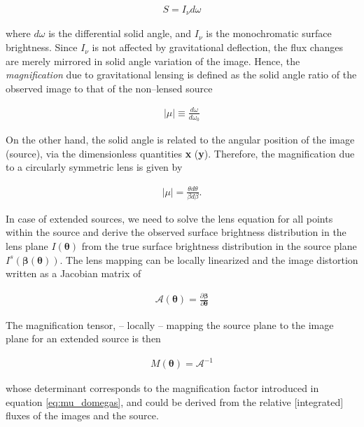 \documentclass[a4wide,12pt]{book}
\begin{document}
{\begin{eqnarray}
\label{eq:flux_to_SB}
S = I_{\nu} d\omega
\end{eqnarray}

where $d\omega$ is the differential solid angle, and $I_{\nu}$ is the monochromatic surface brightness. Since $I_{\nu}$ is not affected by gravitational deflection, the flux changes are merely mirrored in solid angle variation of the image. Hence, the \emph{magnification} due to gravitational lensing is defined as the solid angle ratio of the observed image to that of the non--lensed source

\begin{eqnarray}
\label{eq:mu_domegas}
|\mu| \equiv \frac{d\omega}{d\omega_0}
\end{eqnarray}

On the other hand, the solid angle is related to the angular position of the image (source), via the dimensionless quantities \textbf{x} (\textbf{y}). Therefore, the magnification due to a circularly symmetric lens is given by 

\begin{eqnarray}
\label{eq:mu_beta_theta}
|\mu| = \frac{\theta d\theta}{\beta d\beta}.
\end{eqnarray}

In case of extended sources, we need to solve the lens equation for all points within the source and derive the observed surface brightness distribution in the lens plane $I({\boldsymbol \theta})$ from the true surface brightness distribution in the source plane $I^s({\boldsymbol \beta(\boldsymbol \theta)})$. The lens mapping can be locally linearized and the image distortion written as a Jacobian matrix of 

\begin{eqnarray}
\label{eq:Jacobian}
\mathcal{A}(\boldsymbol \theta) = \frac{\partial \boldsymbol \beta}{\partial \boldsymbol \theta}
\end{eqnarray}

The magnification tensor, -- locally -- mapping the source plane to the image plane for an extended source is then

\begin{eqnarray}
\label{eq:magnification_tensor}
M(\boldsymbol \theta) = \mathcal{A}^{-1}
\end{eqnarray}

whose determinant corresponds to the magnification factor introduced in equation \ref{eq:mu_domegas}, and could be derived from the relative [integrated] fluxes of the images and the source.

}
\end{document}
